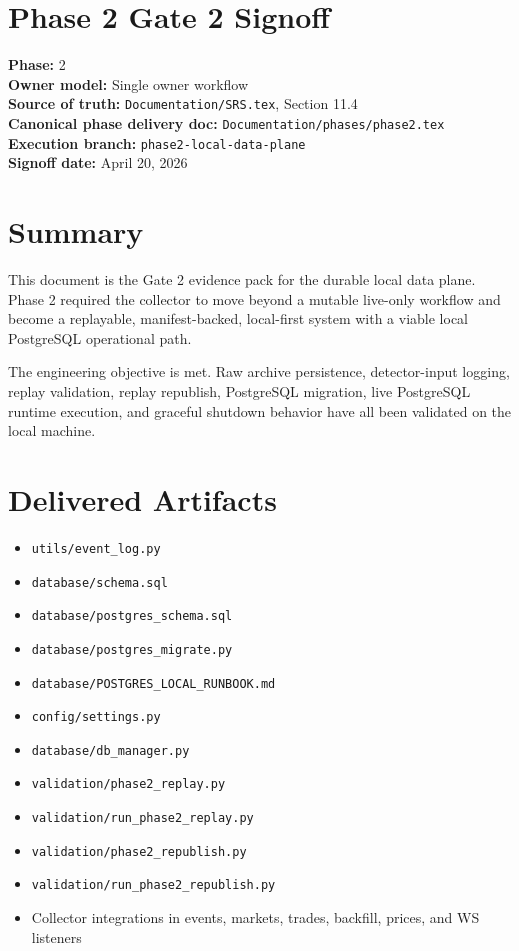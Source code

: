 \documentclass{article}
\begin{document}
\section*{Phase 2 Gate 2 Signoff}

\textbf{Phase:} 2\\
\textbf{Owner model:} Single owner workflow\\
\textbf{Source of truth:} \texttt{Documentation/SRS.tex}, Section 11.4\\
\textbf{Canonical phase delivery doc:} \texttt{Documentation/phases/phase2.tex}\\
\textbf{Execution branch:} \texttt{phase2-local-data-plane}\\
\textbf{Signoff date:} April 20, 2026

\section*{Summary}

This document is the Gate 2 evidence pack for the durable local data plane.
Phase 2 required the collector to move beyond a mutable live-only workflow and
become a replayable, manifest-backed, local-first system with a viable local
PostgreSQL operational path.

The engineering objective is met. Raw archive persistence, detector-input
logging, replay validation, replay republish, PostgreSQL migration, live
PostgreSQL runtime execution, and graceful shutdown behavior have all been
validated on the local machine.

\section*{Delivered Artifacts}

\begin{itemize}
\item \texttt{utils/event\_log.py}
\item \texttt{database/schema.sql}
\item \texttt{database/postgres\_schema.sql}
\item \texttt{database/postgres\_migrate.py}
\item \texttt{database/POSTGRES\_LOCAL\_RUNBOOK.md}
\item \texttt{config/settings.py}
\item \texttt{database/db\_manager.py}
\item \texttt{validation/phase2\_replay.py}
\item \texttt{validation/run\_phase2\_replay.py}
\item \texttt{validation/phase2\_republish.py}
\item \texttt{validation/run\_phase2\_republish.py}
\item Collector integrations in events, markets, trades, backfill, prices, and WS listeners
\end{itemize}
\end{document}
